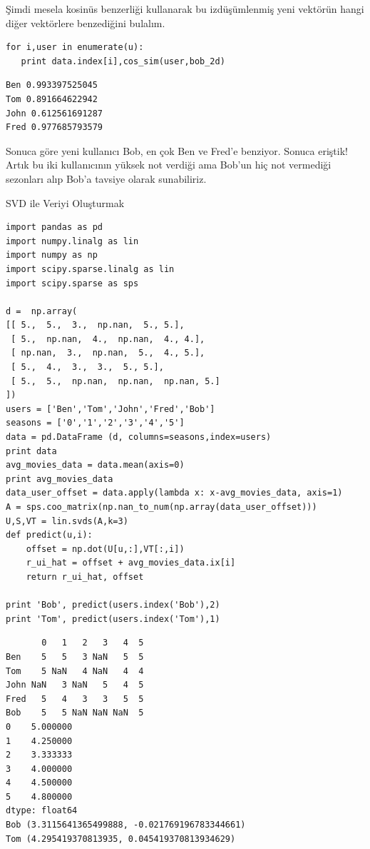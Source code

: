 \documentclass[12pt,fleqn]{article}\usepackage{../../common}
\begin{document}
Şimdi mesela kosinüs benzerliği kullanarak bu izdüşümlenmiş yeni
vektörün hangi diğer vektörlere benzediğini bulalım.

\begin{verbatim}
for i,user in enumerate(u):
   print data.index[i],cos_sim(user,bob_2d)
\end{verbatim}

\begin{verbatim}
Ben 0.993397525045
Tom 0.891664622942
John 0.612561691287
Fred 0.977685793579
\end{verbatim}

Sonuca göre yeni kullanıcı Bob, en çok Ben ve Fred'e benziyor. Sonuca
eriştik! Artık bu iki kullanıcının yüksek not verdiği ama Bob'un hiç
not vermediği sezonları alıp Bob'a tavsiye olarak sunabiliriz.

SVD ile Veriyi Oluşturmak

\begin{verbatim}
import pandas as pd
import numpy.linalg as lin
import numpy as np
import scipy.sparse.linalg as lin
import scipy.sparse as sps

d =  np.array(
[[ 5.,  5.,  3.,  np.nan,  5., 5.],
 [ 5.,  np.nan,  4.,  np.nan,  4., 4.],
 [ np.nan,  3.,  np.nan,  5.,  4., 5.],
 [ 5.,  4.,  3.,  3.,  5., 5.],
 [ 5.,  5.,  np.nan,  np.nan,  np.nan, 5.]
])
users = ['Ben','Tom','John','Fred','Bob']
seasons = ['0','1','2','3','4','5']
data = pd.DataFrame (d, columns=seasons,index=users)
print data
avg_movies_data = data.mean(axis=0)
print avg_movies_data
data_user_offset = data.apply(lambda x: x-avg_movies_data, axis=1)
A = sps.coo_matrix(np.nan_to_num(np.array(data_user_offset)))
U,S,VT = lin.svds(A,k=3)
def predict(u,i):
    offset = np.dot(U[u,:],VT[:,i]) 
    r_ui_hat = offset + avg_movies_data.ix[i] 
    return r_ui_hat, offset

print 'Bob', predict(users.index('Bob'),2)
print 'Tom', predict(users.index('Tom'),1)
\end{verbatim}

\begin{verbatim}
       0   1   2   3   4  5
Ben    5   5   3 NaN   5  5
Tom    5 NaN   4 NaN   4  4
John NaN   3 NaN   5   4  5
Fred   5   4   3   3   5  5
Bob    5   5 NaN NaN NaN  5
0    5.000000
1    4.250000
2    3.333333
3    4.000000
4    4.500000
5    4.800000
dtype: float64
Bob (3.3115641365499888, -0.021769196783344661)
Tom (4.295419370813935, 0.045419370813934629)
\end{verbatim}
\end{document}
